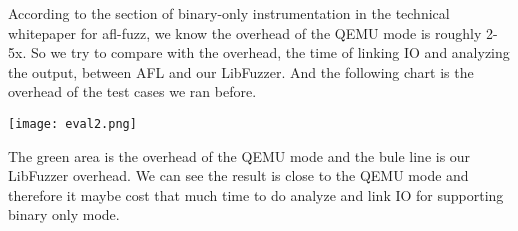 According to the section of binary-only instrumentation in the technical whitepaper for afl-fuzz, we know the overhead of the QEMU mode is roughly 2-5x. So we try to compare with the overhead, the time of linking IO and analyzing the output, between AFL and our LibFuzzer. And the following chart is the overhead of the test cases we ran before.

\texttt{[image: eval2.png]}

The green area is the overhead of the QEMU mode and the bule line is our LibFuzzer overhead. We can see the result is close to the QEMU mode and therefore it maybe cost that much time to do analyze and link IO for supporting binary only mode.

